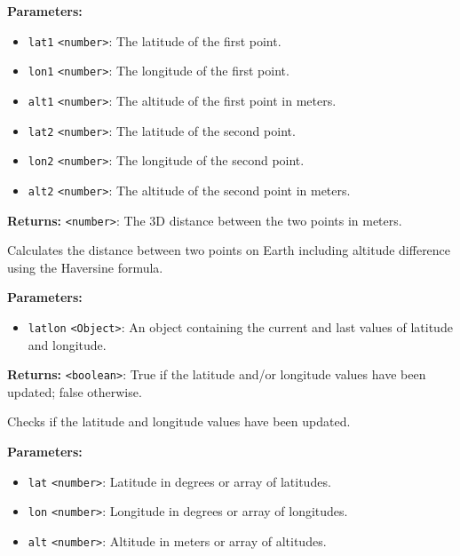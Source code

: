 \documentclass[12pt,a4paper]{article}
\begin{document}
\noindent \textbf{Parameters:}
\begin{itemize}
  \item \texttt{lat1} \texttt{<number>}: The latitude of the first point.
  \item \texttt{lon1} \texttt{<number>}: The longitude of the first point.
  \item \texttt{alt1} \texttt{<number>}: The altitude of the first point in meters.
  \item \texttt{lat2} \texttt{<number>}: The latitude of the second point.
  \item \texttt{lon2} \texttt{<number>}: The longitude of the second point.
  \item \texttt{alt2} \texttt{<number>}: The altitude of the second point in meters.
\end{itemize}

\noindent \textbf{Returns:} \texttt{<number>}: The 3D distance between the two points in meters.

\noindent Calculates the distance between two points on Earth including altitude difference using the Haversine formula.

\vspace{5mm}
\noindent {}


\noindent \textbf{Parameters:}
\begin{itemize}
  \item \texttt{latlon} \texttt{<Object>}: An object containing the current and last values of latitude and longitude.
\end{itemize}

\noindent \textbf{Returns:} \texttt{<boolean>}: True if the latitude and/or longitude values have been updated; false otherwise.

\noindent Checks if the latitude and longitude values have been updated.

\vspace{5mm}
\noindent {}


\noindent \textbf{Parameters:}
\begin{itemize}
  \item \texttt{lat} \texttt{<number>}: Latitude in degrees or array of latitudes.
  \item \texttt{lon} \texttt{<number>}: Longitude in degrees or array of longitudes.
  \item \texttt{alt} \texttt{<number>}: Altitude in meters or array of altitudes.
\end{itemize}
\end{document}
